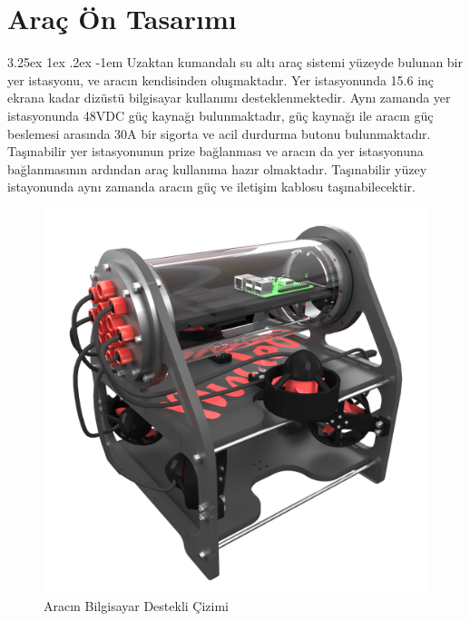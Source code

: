 \documentclass[12pt]{article}
\makeatletter
\renewcommand\paragraph{\@startsection{paragraph}{5}{\z@}%
  {3.25ex \@plus1ex \@minus.2ex}%
  {-1em}%
  {\normalfont\normalsize\bfseries}}
\makeatother
\begin{document}
\newpage

\section{Araç Ön Tasarımı}

\paragraph{} Uzaktan kumandalı su altı araç sistemi yüzeyde bulunan bir yer istasyonu, ve aracın kendisinden oluşmaktadır. Yer istasyonunda 15.6 inç ekrana kadar dizüstü bilgisayar kullanımı desteklenmektedir. Aynı zamanda yer istasyonunda 48VDC güç kaynağı bulunmaktadır, güç kaynağı ile aracın güç beslemesi arasında 30A bir sigorta ve acil durdurma butonu bulunmaktadır. Taşınabilir yer istasyonunun prize bağlanması ve aracın da yer istasyonuna bağlanmasının ardından araç kullanıma hazır olmaktadır. Taşınabilir yüzey istayonunda aynı zamanda aracın güç ve iletişim kablosu taşınabilecektir.

\begin{figure}[hbt!]
\centering
\includegraphics[width=1\textwidth]{render.png}
\caption{Aracın Bilgisayar Destekli Çizimi}
\label{fig:render}
\end{figure}

\newpage
\end{document}

